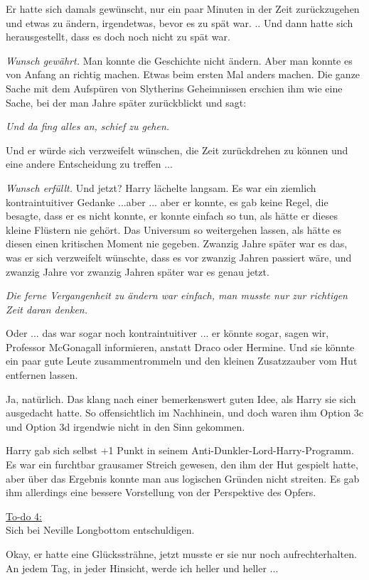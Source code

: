 Er hatte sich damals gewünscht, nur ein paar Minuten in der Zeit zurückzugehen
und etwas zu ändern, irgendetwas, bevor es zu spät war. .. Und dann hatte sich
herausgestellt, dass es doch noch nicht zu spät war.

\emph{Wunsch gewährt.} Man konnte die Geschichte nicht ändern. Aber man konnte
es von Anfang an richtig machen. Etwas beim ersten Mal anders machen. Die ganze
Sache mit dem Aufspüren von Slytherins Geheimnissen erschien ihm wie eine Sache,
bei der man Jahre später zurückblickt und sagt:

\emph{Und da fing alles an, schief zu gehen.}

Und er würde sich verzweifelt wünschen, die Zeit zurückdrehen zu können und eine
andere Entscheidung zu treffen ...

\emph{Wunsch erfüllt.} Und jetzt? Harry lächelte langsam. Es war ein ziemlich
kontraintuitiver Gedanke ...aber ... aber er konnte, es gab keine Regel, die
besagte, dass er es nicht konnte, er konnte einfach so tun, als hätte er dieses
kleine Flüstern nie gehört. Das Universum so weitergehen lassen, als hätte es
diesen einen kritischen Moment nie gegeben. Zwanzig Jahre später war es das, was
er sich verzweifelt wünschte, dass es vor zwanzig Jahren passiert wäre, und
zwanzig Jahre vor zwanzig Jahren später war es genau jetzt.

\emph{Die ferne Vergangenheit zu ändern war einfach, man musste nur zur
richtigen Zeit daran denken.}

Oder ... das war sogar noch kontraintuitiver ... er könnte sogar, sagen wir,
Professor McGonagall informieren, anstatt Draco oder Hermine. Und sie könnte ein
paar gute Leute zusammentrommeln und den kleinen Zusatzzauber vom Hut entfernen
lassen.

Ja, natürlich. Das klang nach einer bemerkenswert guten Idee, als Harry sie sich
ausgedacht hatte. So offensichtlich im Nachhinein, und doch waren ihm Option 3c
und Option 3d irgendwie nicht in den Sinn gekommen.

Harry gab sich selbst +1 Punkt in seinem Anti-Dunkler-Lord-Harry-Programm. Es
war ein furchtbar grausamer Streich gewesen, den ihm der Hut gespielt hatte,
aber über das Ergebnis konnte man aus logischen Gründen nicht streiten. Es gab
ihm allerdings eine bessere Vorstellung von der Perspektive des Opfers.

\underline{To-do 4:}\\
Sich bei Neville Longbottom entschuldigen.

Okay, er hatte eine Glückssträhne, jetzt musste er sie nur noch
aufrechterhalten. An jedem Tag, in jeder Hinsicht, werde ich heller und
heller ...

